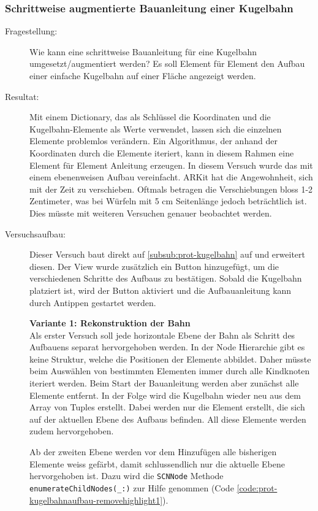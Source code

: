 \subsubsection{Schrittweise augmentierte Bauanleitung einer Kugelbahn}\label{subsub:prot-kugelbahnaufbau}
\begin{description}
	\item[Fragestellung:] Wie kann eine schrittweise Bauanleitung für eine Kugelbahn umgesetzt/augmentiert werden? Es soll Element für Element den Aufbau einer einfache Kugelbahn auf einer Fläche angezeigt werden.
	\item[Resultat:] Mit einem Dictionary, das als Schlüssel die Koordinaten und die Kugelbahn-Elemente als Werte verwendet, lassen sich die einzelnen Elemente problemlos verändern. Ein Algorithmus, der anhand der Koordinaten durch die Elemente iteriert, kann in diesem Rahmen eine Element für Element Anleitung erzeugen. In diesem Versuch wurde das mit einem ebenenweisen Aufbau vereinfacht. ARKit hat die Angewohnheit, sich mit der Zeit zu verschieben. Oftmals betragen die Verschiebungen bloss 1-2 Zentimeter, was bei Würfeln mit 5 cm Seitenlänge jedoch beträchtlich ist. Dies müsste mit weiteren Versuchen genauer beobachtet werden.
	\item[Versuchsaufbau:] Dieser Versuch baut direkt auf \ref{subsub:prot-kugelbahn} auf und erweitert diesen. Der View wurde zusätzlich ein Button hinzugefügt, um die verschiedenen Schritte des Aufbaus zu bestätigen. Sobald die Kugelbahn platziert ist, wird der Button aktiviert und die Aufbauanleitung kann durch Antippen gestartet werden.

	\textbf{Variante 1: Rekonstruktion der Bahn}\\
	Als erster Versuch soll jede horizontale Ebene der Bahn als Schritt des Aufbauens separat hervorgehoben werden. In der Node Hierarchie gibt es keine Struktur, welche die Positionen der Elemente abbildet. Daher müsste beim Auswählen von bestimmten Elementen immer durch alle Kindknoten iteriert werden. Beim Start der Bauanleitung werden aber zunächst alle Elemente entfernt. In der Folge wird die Kugelbahn wieder neu aus dem Array von Tuples erstellt. Dabei werden nur die Element erstellt, die sich auf der aktuellen Ebene des Aufbaus befinden. All diese Elemente werden zudem hervorgehoben.

	Ab der zweiten Ebene werden vor dem Hinzufügen alle bisherigen Elemente weiss gefärbt, damit schlussendlich nur die aktuelle Ebene hervorgehoben ist. Dazu wird die \texttt{SCNNode} Methode \texttt{enumerateChildNodes(\_:)} zur Hilfe genommen (Code \ref{code:prot-kugelbahnaufbau-removehighlight1}).


\end{description}
